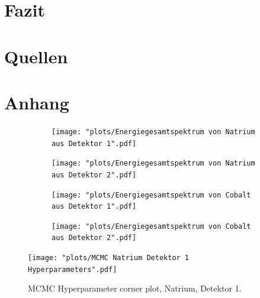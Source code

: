 \documentclass[%
aps,
onecolumn,
11pt,
tightenlines,
nofootinbib,
superscriptaddress,
floatfix,
prd,
]{revtex4-2}
\begin{document}




\section{Fazit}
\label{sec:Fazit}



\section{Quellen}




\section{Anhang}
\label{sec:Anhang}
\begin{figure}[ht]
	\label{fig:initialplotsSo}
	\begin{subfigure}[c]{0.8\textwidth}
		\texttt{[image: "plots/Energiegesamtspektrum von Natrium aus Detektor 1".pdf]}
	\end{subfigure}

	\begin{subfigure}[c]{0.8\textwidth}
		\texttt{[image: "plots/Energiegesamtspektrum von Natrium aus Detektor 2".pdf]}
	\end{subfigure}
\end{figure}

\begin{figure}[ht]
	\label{fig:initialplotsCo}
	\begin{subfigure}[c]{0.8\textwidth}
		\texttt{[image: "plots/Energiegesamtspektrum von Cobalt aus Detektor 1".pdf]}
	\end{subfigure}

	\begin{subfigure}[c]{0.8\textwidth}
		\texttt{[image: "plots/Energiegesamtspektrum von Cobalt aus Detektor 2".pdf]}
	\end{subfigure}

\end{figure}
\begin{figure}		
	\texttt{[image: "plots/MCMC Natrium Detektor 1 Hyperparameters".pdf]}
	\caption{MCMC Hyperparameter corner plot, Natrium, Detektor 1.}
\end{figure}
\end{document}
